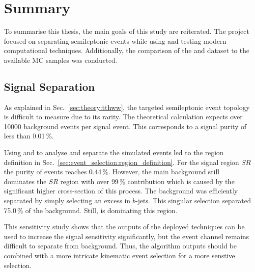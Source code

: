 \documentclass[bachelor,ngerman,english]{GAUBM}
\begin{document}
\section{Summary}
\label{sec:discussion:summary}
To summarise this thesis, the main goals of this study are reiterated. The project focused on separating semileptonic \ttHWW events while using and testing modern computational techniques. Additionally, the comparison of the \runi and \runii dataset to the available MC samples was conducted.

\subsection*{Signal Separation}
As explained in Sec.~\ref{sec:theory:tthww}, the targeted semileptonic \ttHWW event topology is difficult to measure due to its rarity. The theoretical calculation expects over 10000 background events per signal event. This corresponds to a signal purity of less than 0.01\,\%. 

Using \spanet and \NW to analyse and separate the simulated events led to the region definition in Sec.~\ref{sec:event_selection:region_definition}. For the signal region $SR$ the purity of \ttHWW events reaches 0.44\,\%. However, the main \ttbar background still dominates the $SR$ region with over 99\,\% contribution which is caused by the significant higher cross-section of this process. The \ttHbb background was efficiently separated by simply selecting an excess in $b$-jets. This singular selection separated 75.0\,\% of the \ttHbb background.  Still, \ttbar is dominating this region.

This sensitivity study shows that the outputs of the deployed techniques can be used to increase the signal sensitivity significantly, but the event channel remains difficult to separate from background. Thus, the algorithm outputs should be combined with a more intricate kinematic event selection for a more senstive selection.
\end{document}
